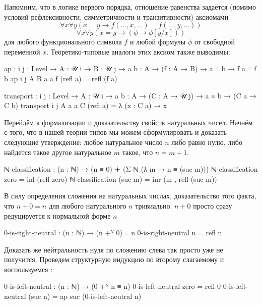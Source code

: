 \documentclass{article}[12pt]
\begin{document}
Напомним, что в логике первого порядка, отношение равенства задаётся (помимо условий
рефлексивности, симметричности и транзитивности) аксиомами
$$\forall x \forall y (x = y \rightarrow f(\dots, x, \dots) = f(\dots, y, \dots))$$
$$\forall x \forall y (x = y \rightarrow (\phi \rightarrow \phi[y/x]))$$
для любого функционального символа $f$ и любой формулы $\phi$ от свободной переменной $x$.
Теоретико-типовые аналоги этих аксиом также выводимы:
\begin{code}
ap : {i j : Level} → {A : 𝒰 i} → {B : 𝒰 j} → {a b : A} → (f : A → B)
     → a ≡ b → f a ≡ f b
ap {i} {j} {A} {B} {a} {a} f (refl a) = refl (f a)

transport : {i j : Level} → {A : 𝒰 i}  → {a b : A} → (C : A → 𝒰 j)
            → a ≡ b → (C a → C b)
transport {i} {j} {A} {a} {a} C (refl a) = λ (x : C a) → x
\end{code}

Перейдём к формализации и доказательству свойств натуральных чисел. Начнём с того, что в нашей теории типов
мы можем сформулировать и доказать следующие утверждение: любое натуральное число $n$ либо равно нулю,
либо найдется такое другое натуральное $m$ такое, что $n = m + 1$.
\begin{code}
ℕ-classification : (n : ℕ) → (n ≡ 0) ∔ (Σ ℕ (λ m → n ≡ (suc m)))
ℕ-classification zero = inl (refl zero)
ℕ-classification (suc m) = inr (m , refl (suc m))
\end{code}

В силу определения сложения на натуральных числах, доказательство того факта, что $n + 0 = n$ 
для любого натурального $n$ тривиально: $n + 0$ просто сразу редуцируется к нормальной форме $n$
\begin{code}
0-is-right-neutral : (n : ℕ) → (n +ᴺ 0) ≡ n
0-is-right-neutral n = refl n
\end{code}
Доказать же нейтральность нуля по сложению слева так просто уже не получится. Проведем структурную
индукцию по второму слагаемому и воспользуемся :
\begin{code}
0-is-left-neutral : (n : ℕ) → (0 +ᴺ n ≡ n)
0-is-left-neutral zero = refl 0
0-is-left-neutral (suc n) = ap suc (0-is-left-neutral n)
\end{code}
\end{document}
